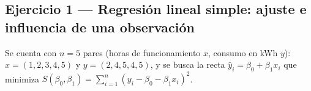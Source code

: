 \subsection{Ejercicio 1 --- Regresión lineal simple: ajuste e influencia de una observación}

Se cuenta con $n=5$ pares (horas de funcionamiento $x$, consumo en kWh
$y$): $x=(1,2,3,4,5)$ y $y=(2,4,5,4,5)$, y se busca la recta
$\hat y_i=\beta_0+\beta_1x_i$ que minimiza
$S(\beta_0,\beta_1)=\sum_{i=1}^{n}(y_i-\beta_0-\beta_1x_i)^2$.

